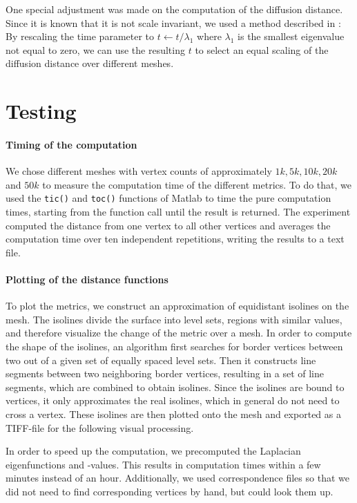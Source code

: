 One special adjustment was made on the computation of the diffusion distance.
Since it is known that it is not scale invariant, we used a method described in \cite{lipman2010biharmonic}:
By rescaling the time parameter to $t \leftarrow t/\lambda_1$ where $\lambda_1$ is the smallest eigenvalue not equal to zero, we can use the resulting $t$ to select an equal scaling of the diffusion distance over different meshes.

\section{Testing}
\paragraph{Timing of the computation}
We chose different meshes with vertex counts of approximately $1k, 5k, 10k, 20k$ and $50k$ to measure the computation time of the different metrics.
To do that, we used the \texttt{tic()} and \texttt{toc()} functions of Matlab to time the pure computation times, starting from the function call until the result is returned.
The experiment computed the distance from one vertex to all other vertices and averages the computation time over ten independent repetitions, writing the results to a text file.

\paragraph{Plotting of the distance functions}
To plot the metrics, we construct an approximation of equidistant isolines on the mesh.
The isolines divide the surface into level sets, regions with similar values, and therefore visualize the change of the metric over a mesh.
In order to compute the shape of the isolines, an algorithm first searches for border vertices between two out of a given set of equally spaced level sets.
Then it constructs line segments between two neighboring border vertices, resulting in a set of line segments, which are combined to obtain isolines.
Since the isolines are bound to vertices, it only approximates the real isolines, which in general do not need to cross a vertex.
These isolines are then plotted onto the mesh and exported as a TIFF-file for the following visual processing.

In order to speed up the computation, we precomputed the Laplacian eigenfunctions and -values.
This results in computation times within a few minutes instead of an hour.
Additionally, we used correspondence files so that we did not need to find corresponding vertices by hand, but could look them up.

